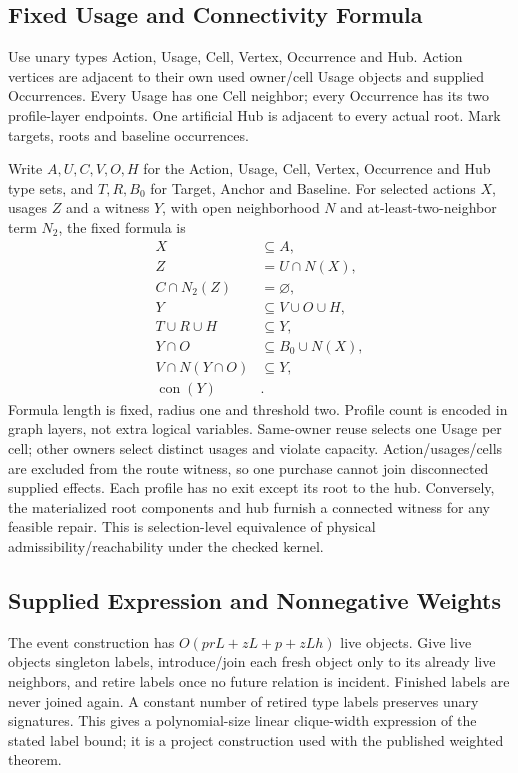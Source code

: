 \subsection{Fixed Usage and Connectivity Formula}
Use unary types Action, Usage, Cell, Vertex, Occurrence and Hub. Action vertices are adjacent to their own used owner/cell Usage objects and supplied Occurrences. Every Usage has one Cell neighbor; every Occurrence has its two profile-layer endpoints. One artificial Hub is adjacent to every actual root. Mark targets, roots and baseline occurrences.

Write $A,U,C,V,O,H$ for the Action, Usage, Cell, Vertex, Occurrence and Hub type sets, and $T,R,B_0$ for Target, Anchor and Baseline. For selected actions $X$, usages $Z$ and a witness $Y$, with open neighborhood $N$ and at-least-two-neighbor term $N_2$, the fixed formula is
\begin{align}
X&\subseteq A,\\
Z&=U\cap N(X),\\
C\cap N_2(Z)&=\varnothing,\\
Y&\subseteq V\cup O\cup H,\\
T\cup R\cup H&\subseteq Y,\\
Y\cap O&\subseteq B_0\cup N(X),\\
V\cap N(Y\cap O)&\subseteq Y,\\
\operatorname{con}(Y)&.
\end{align}
Formula length is fixed, radius one and threshold two. Profile count is encoded in graph layers, not extra logical variables. Same-owner reuse selects one Usage per cell; other owners select distinct usages and violate capacity. Action/usages/cells are excluded from the route witness, so one purchase cannot join disconnected supplied effects. Each profile has no exit except its root to the hub. Conversely, the materialized root components and hub furnish a connected witness for any feasible repair. This is selection-level equivalence of physical admissibility/reachability under the checked kernel.

\subsection{Supplied Expression and Nonnegative Weights}
The event construction has $O(prL+zL+p+zLh)$ live objects. Give live objects singleton labels, introduce/join each fresh object only to its already live neighbors, and retire labels once no future relation is incident. Finished labels are never joined again. A constant number of retired type labels preserves unary signatures. This gives a polynomial-size linear clique-width expression of the stated label bound; it is a project construction used with the published weighted theorem.

